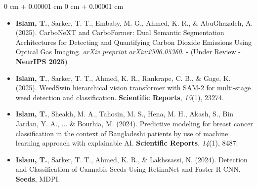 \documentclass[10pt, letterpaper]{article}
\newenvironment{highlights}{
    \begin{itemize}[
        topsep=0.10 cm,
        parsep=0.10 cm,
        partopsep=0pt,
        itemsep=0pt,
        leftmargin=0 cm + 10pt
    ]
}{
    \end{itemize}
} %
\newenvironment{onecolentry}{
    \begin{adjustwidth}{
        0 cm + 0.00001 cm
    }{
        0 cm + 0.00001 cm
    }
}{
    \end{adjustwidth}
} %
\begin{document}
\begin{onecolentry}
    \begin{highlights}
        \item \textbf{Islam, T.}, Sarker, T. T., Embaby, M. G., Ahmed, K. R., \& AbuGhazaleh, A. (2025). CarboNeXT and CarboFormer: Dual Semantic Segmentation Architectures for Detecting and Quantifying Carbon Dioxide Emissions Using Optical Gas Imaging. \textit{arXiv preprint arXiv:2506.05360}. - (Under Review - \textbf{NeurIPS 2025})
        
        \item \textbf{Islam, T.}, Sarker, T. T., Ahmed, K. R., Rankrape, C. B., \& Gage, K. (2025). WeedSwin hierarchical vision transformer with SAM-2 for multi-stage weed detection and classification. \textbf{Scientific Reports}, \textit{15}(1), 23274.

         \item \textbf{Islam, T.}, Sheakh, M. A., Tahosin, M. S., Hena, M. H., Akash, S., Bin Jardan, Y. A., ... \& Bourhia, M. (2024). Predictive modeling for breast cancer classification in the context of Bangladeshi patients by use of machine learning approach with explainable AI. \textbf{Scientific Reports}, \textit{14}(1), 8487.

         \item \textbf{Islam, T.}, Sarker, T. T., Ahmed, K. R., \& Lakhssassi, N. (2024). Detection and Classification of Cannabis Seeds Using RetinaNet and Faster R-CNN. \textbf{Seeds}, MDPI.
         
        
        
    \end{highlights}
\end{onecolentry}
    
\end{document}
